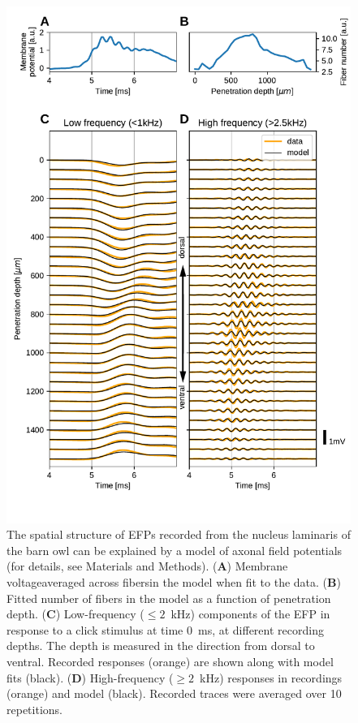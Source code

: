 \documentclass[]{article}
\providecommand{\DIFaddtex}[1]{{\protect\color{blue}\uwave{#1}}} %
\providecommand{\DIFdeltex}[1]{{\protect\color{red}\sout{#1}}}                      %
\providecommand{\DIFaddFL}[1]{\DIFadd{#1}} %
\providecommand{\DIFdelFL}[1]{\DIFdel{#1}} %
\providecommand{\DIFaddbeginFL}{} %
\providecommand{\DIFaddendFL}{} %
\providecommand{\DIFdelbeginFL}{} %
\providecommand{\DIFdelendFL}{} %
\providecommand{\DIFadd}[1]{\texorpdfstring{\DIFaddtex{#1}}{#1}} %
\providecommand{\DIFdel}[1]{\texorpdfstring{\DIFdeltex{#1}}{}} %
\begin{document}
\begin{figure}[htbp]
\centering
\DIFdelbeginFL %
\DIFdelendFL \DIFaddbeginFL \includegraphics[height=1.15000\textwidth]{figs/fig_5.pdf}
\DIFaddendFL \caption{\label{fig:barnowl}The spatial structure of EFPs recorded from
the nucleus laminaris of the barn owl can be explained by a model of
axonal field potentials (for details, see Materials and Methods).
(\textbf{A}) Membrane voltage\DIFaddbeginFL \DIFaddFL{, }\DIFaddendFL averaged across fibers\DIFaddbeginFL \DIFaddFL{, }\DIFaddendFL in the model when
fit to the data. (\textbf{B}) Fitted number of fibers in the model as a
function of penetration depth. (\textbf{C}) Low-frequency (\DIFdelbeginFL \DIFdelFL{\(\leq 2\)}\DIFdelendFL \DIFaddbeginFL \DIFaddFL{\(< 1\)}\DIFaddendFL ~kHz)
components of the EFP in response to a click stimulus at time 0~ms, at
different recording depths. The depth is measured in the direction from
dorsal to ventral. Recorded responses (orange) are shown along with
model fits (black). (\textbf{D}) High-frequency (\DIFdelbeginFL \DIFdelFL{\(\geq 2\)}\DIFdelendFL \DIFaddbeginFL \DIFaddFL{\(> 2.5\)}\DIFaddendFL ~kHz)
responses in recordings (orange) and model (black). Recorded traces were
averaged over 10 repetitions.}
\end{figure}
\end{document}
